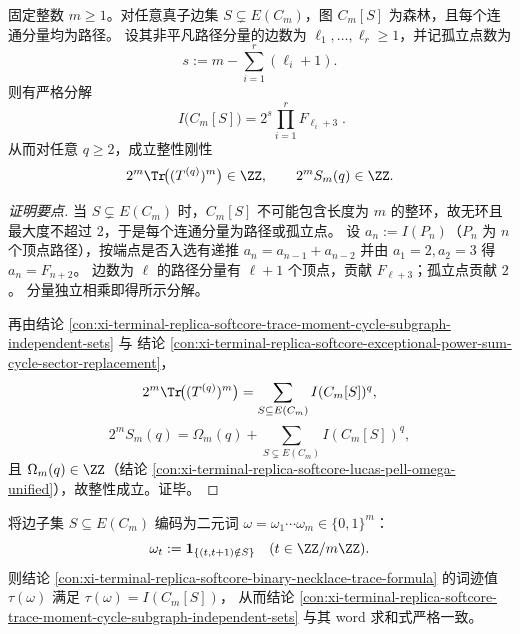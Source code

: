 \begin{conclusion}\label{con:xi-terminal-replica-softcore-cycle-subgraph-fibonacci-factorization-denominator-rigidity}
固定整数 \(m\ge 1\)。对任意真子边集 \(S\subsetneq E(C_m)\)，图 \(C_m[S]\) 为森林，且每个连通分量均为路径。
设其非平凡路径分量的边数为 \(\ell_1,\dots,\ell_r\ge 1\)，并记孤立点数为
\[
s:=m-\sum_{i=1}^{r}(\ell_i+1).
\]
则有严格分解
\[
\boxed{\;
I\!\bigl(C_m[S]\bigr)=2^{s}\prod_{i=1}^{r}F_{\ell_i+3}\;} .
\]
从而对任意 \(q\ge 2\)，成立整性刚性
\[
2^m\Tr\!\bigl((T^{(q)})^m\bigr)\in\ZZ,
\qquad
2^mS_m(q)\in\ZZ.
\]
\end{conclusion}
\begin{proof}[证明要点]
当 \(S\subsetneq E(C_m)\) 时，\(C_m[S]\) 不可能包含长度为 \(m\) 的整环，故无环且最大度不超过 \(2\)，于是每个连通分量为路径或孤立点。
设 \(a_n:=I(P_n)\)（\(P_n\) 为 \(n\) 个顶点路径），按端点是否入选有递推
\(
a_n=a_{n-1}+a_{n-2}
\)
并由 \(a_1=2,a_2=3\) 得 \(a_n=F_{n+2}\)。
边数为 \(\ell\) 的路径分量有 \(\ell+1\) 个顶点，贡献 \(F_{\ell+3}\)；孤立点贡献 \(2\)。
分量独立相乘即得所示分解。
\par
再由结论 \ref{con:xi-terminal-replica-softcore-trace-moment-cycle-subgraph-independent-sets} 与
结论 \ref{con:xi-terminal-replica-softcore-exceptional-power-sum-cycle-sector-replacement}，
\[
2^m\Tr\!\bigl((T^{(q)})^m\bigr)=\sum_{S\subseteq E(C_m)}I(C_m[S])^{q},
\]
\[
2^mS_m(q)=\Omega_m(q)+\sum_{S\subsetneq E(C_m)}I(C_m[S])^{q},
\]
且 \(\Omega_m(q)\in\ZZ\)（结论 \ref{con:xi-terminal-replica-softcore-lucas-pell-omega-unified}），故整性成立。证毕。
\end{proof}

\begin{remark}\label{rem:xi-terminal-replica-softcore-trace-moment-cycle-subgraph-word-identification}
将边子集 \(S\subseteq E(C_m)\) 编码为二元词 \(\omega=\omega_1\cdots\omega_m\in\{0,1\}^m\)：
\[
\omega_t:=\mathbf{1}_{\{(t,t+1)\notin S\}}\quad(t\in\ZZ/m\ZZ).
\]
则结论 \ref{con:xi-terminal-replica-softcore-binary-necklace-trace-formula} 的词迹值 \(\tau(\omega)\) 满足
\(\tau(\omega)=I(C_m[S])\)，
从而结论 \ref{con:xi-terminal-replica-softcore-trace-moment-cycle-subgraph-independent-sets} 与其 word 求和式严格一致。
\end{remark}

